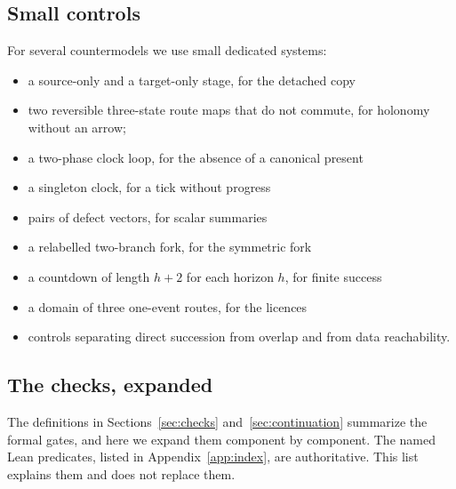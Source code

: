 \subsection{Small controls}
\label{app:controls}

For several countermodels we use small dedicated systems:
\begin{itemize}
\item a source-only and a target-only stage, for the detached copy
\item two reversible three-state route maps that do not commute, for holonomy
without an arrow;
\item a two-phase clock loop, for the absence of a canonical present
\item a singleton clock, for a tick without progress
\item pairs of defect vectors, for scalar summaries
\item a relabelled two-branch fork, for the symmetric fork
\item a countdown of length $h+2$ for each horizon $h$, for finite success
\item a domain of three one-event routes, for the licences
\item controls separating direct succession from overlap and from data
reachability.
\end{itemize}

\subsection{The checks, expanded}
\label{app:checks}

The definitions in Sections~\ref{sec:checks} and~\ref{sec:continuation}
summarize the formal gates, and here we expand them component by component.
The named Lean predicates, listed in Appendix~\ref{app:index}, are
authoritative. This list explains them and does not replace them.

